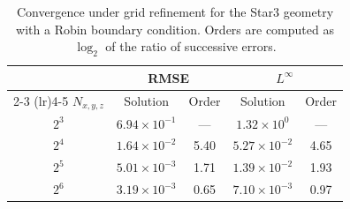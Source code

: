 \begin{table}[H]
  \centering
  \caption{Convergence under grid refinement for the Star3 geometry with a Robin
           boundary condition. Orders are computed as $\log_{2}$ of the ratio of
           successive errors.}
  \label{tab:conv-star3}
  \begin{tabular}{ccccc}
    \toprule
    & \multicolumn{2}{c}{RMSE} & \multicolumn{2}{c}{$L^{\infty}$} \\
    \cmidrule(lr){2-3} \cmidrule(lr){4-5}
    $N_{x,y,z}$ & Solution & Order & Solution & Order \\
    \midrule
    $2^{3}$ & $6.94 \times 10^{-1}$ & --- & $1.32 \times 10^{0}$ & --- \\
    $2^{4}$ & $1.64 \times 10^{-2}$ & 5.40 & $5.27 \times 10^{-2}$ & 4.65 \\
    $2^{5}$ & $5.01 \times 10^{-3}$ & 1.71 & $1.39 \times 10^{-2}$ & 1.93 \\
    $2^{6}$ & $3.19 \times 10^{-3}$ & 0.65 & $7.10 \times 10^{-3}$ & 0.97 \\
    \bottomrule
  \end{tabular}
\end{table}

